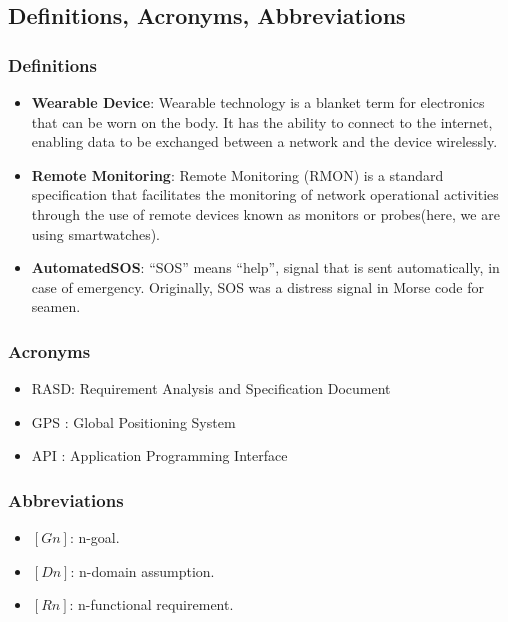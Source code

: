 \documentclass[12pt]{article}
\begin{document}
\subsection{Definitions, Acronyms, Abbreviations}
\subsubsection{Definitions}
\begin{itemize}
\item{} \textbf{Wearable Device}: Wearable technology is a blanket term for electronics that can be worn on the body. It has the ability to connect to the internet, enabling data to be exchanged between a network and the device wirelessly.

\item{} \textbf{Remote Monitoring}: Remote Monitoring (RMON) is a standard specification that facilitates the monitoring of network operational activities through the use of remote devices known as monitors or probes(here, we are using smartwatches).

\item{} \textbf{AutomatedSOS}: “SOS” means “help”, signal that is sent automatically, in case of emergency. Originally, SOS was a distress signal in Morse code for seamen.

\end{itemize}
\subsubsection{Acronyms}
\begin{itemize}
\item{} RASD: Requirement Analysis and Specification Document
\item{} GPS : Global Positioning System
\item{} API : Application Programming Interface

\end{itemize}

\subsubsection{Abbreviations}
\begin{itemize}
\item $[Gn]$: n-goal. 
\item $[Dn]$: n-domain assumption. 
\item $[Rn]$: n-functional requirement. 

\end{itemize}
\end{document}
